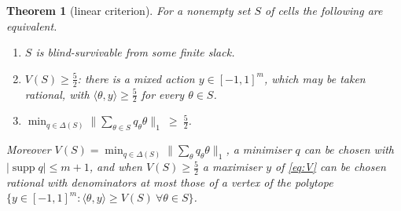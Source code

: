 \documentclass[11pt,a4paper]{article}
\theoremstyle{plain}
\newtheorem{theorem}{Theorem}[section]
\theoremstyle{definition}
\theoremstyle{remark}
\newcommand{\supp}{\operatorname{supp}}
\newcommand{\tfr}[2]{\tfrac{#1}{#2}}
\begin{document}
\begin{theorem}[linear criterion]\label{thm:criterion}
For a nonempty set $S$ of cells the following are equivalent.
\begin{enumerate}[label=(\roman*),leftmargin=2.2em,itemsep=1pt]
\item $S$ is blind-survivable from some finite slack.
\item $V(S)\ge\tfr52$: there is a mixed action $y\in[-1,1]^m$, which may be taken rational, with $\langle\theta,y\rangle\ge\tfr52$ for every $\theta\in S$.
\item $\min_{q\in\Delta(S)}\big\|\sum_{\theta\in S}q_\theta\theta\big\|_1\ \ge\ \tfr52$.
\end{enumerate}
Moreover $V(S)=\min_{q\in\Delta(S)}\|\sum_\theta q_\theta\theta\|_1$, a minimiser $q$ can be chosen with $|\supp q|\le m+1$, and when $V(S)\ge\tfr52$ a maximiser $y$ of \eqref{eq:V} can be chosen rational with denominators at most those of a vertex of the polytope $\{y\in[-1,1]^m:\langle\theta,y\rangle\ge V(S)\ \forall\theta\in S\}$.
\end{theorem}
\end{document}
